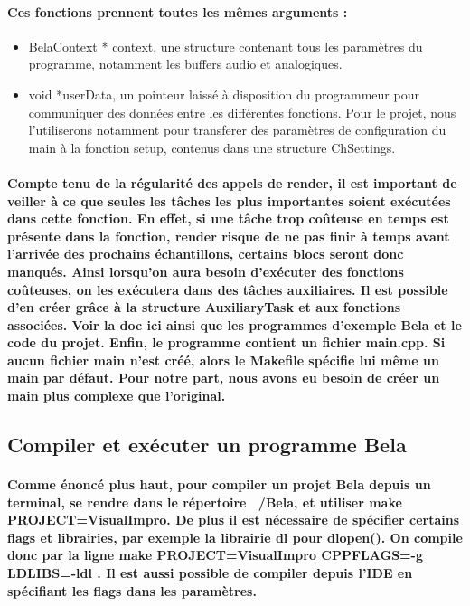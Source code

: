 \documentclass[a4paper]{article}
\begin{document}
\paragraph{Ces fonctions prennent toutes les mêmes arguments :}

\begin{itemize} \item BelaContext * context, une structure contenant tous les
paramètres du programme, notamment les buffers audio et analogiques. \item void
*userData, un pointeur laissé à disposition du programmeur pour communiquer des
données entre les différentes fonctions. Pour le projet, nous l’utiliserons
notamment pour transferer des paramètres de configuration du main à la fonction
setup, contenus dans une structure ChSettings. \end{itemize}

\paragraph{Compte tenu de la régularité des appels de render, il est important
de veiller à ce que seules les tâches les plus importantes soient exécutées dans
cette fonction. En effet, si une tâche trop coûteuse en temps est présente dans
la fonction, render risque de ne pas finir à temps avant l’arrivée des prochains
échantillons, certains blocs seront donc manqués. Ainsi lorsqu’on aura besoin
d’exécuter des fonctions coûteuses, on les exécutera dans des tâches
auxiliaires. Il est possible d’en créer grâce à la structure AuxiliaryTask et
aux fonctions associées. Voir la doc ici ainsi que les programmes d’exemple Bela
et le code du projet. Enfin, le programme contient un fichier main.cpp. Si aucun
fichier main n’est créé, alors le Makefile spécifie lui même un main par défaut.
Pour notre part, nous avons eu besoin de créer un main plus complexe que
l’original.}

\subsection{Compiler et exécuter un programme Bela} \paragraph{Comme énoncé plus
haut, pour compiler un projet Bela depuis un terminal, se rendre dans le
répertoire ~/Bela, et utiliser make PROJECT=VisualImpro. De plus il est
nécessaire de spécifier certains flags et librairies, par exemple la librairie
dl pour dlopen(). On compile donc par la ligne make PROJECT=VisualImpro
CPPFLAGS=-g LDLIBS=-ldl . Il est aussi possible de compiler depuis l’IDE en
spécifiant les flags dans les paramètres.}
\end{document}
